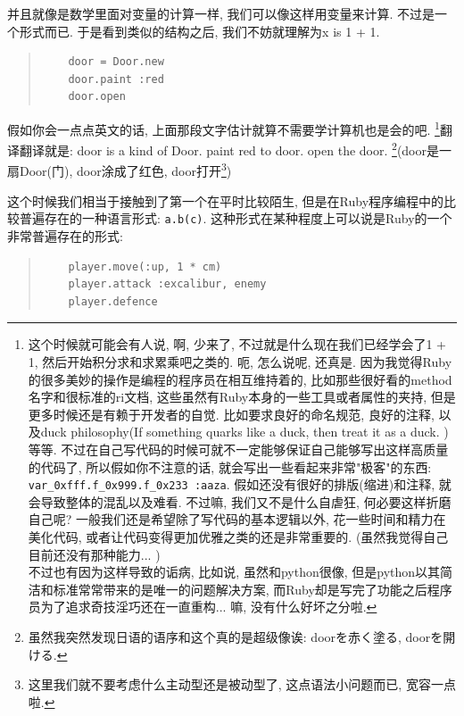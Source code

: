 并且就像是数学里面对变量的计算一样, 我们可以像这样用变量来计算. 不过是一个形式而已. 于是看到类似的结构之后, 我们不妨就理解为x is 1 + 1. 

\begin{quotation}
  \begin{verbatim}
    door = Door.new
    door.paint :red
    door.open
  \end{verbatim}
\end{quotation}

假如你会一点点英文的话, 上面那段文字估计就算不需要学计算机也是会的吧. \footnote{这个时候就可能会有人说, 啊, 少来了, 不过就是什么现在我们已经学会了1 + 1, 然后开始积分求和求累乘吧之类的. 呃, 怎么说呢, 还真是. 因为我觉得Ruby的很多美妙的操作是编程的程序员在相互维持着的, 比如那些很好看的method名字和很标准的ri文档, 这些虽然有Ruby本身的一些工具或者属性的夹持, 但是更多时候还是有赖于开发者的自觉. 比如要求良好的命名规范, 良好的注释, 以及duck philosophy(If something quarks like a duck, then treat it as a duck. )等等. 不过在自己写代码的时候可就不一定能够保证自己能够写出这样高质量的代码了, 所以假如你不注意的话, 就会写出一些看起来非常"极客"的东西: \texttt{var_0xfff.f_0x999.f_0x233 :aaza}. 假如还没有很好的排版(缩进)和注释, 就会导致整体的混乱以及难看. 不过嘛, 我们又不是什么自虐狂, 何必要这样折磨自己呢? 一般我们还是希望除了写代码的基本逻辑以外, 花一些时间和精力在美化代码, 或者让代码变得更加优雅之类的还是非常重要的. (虽然我觉得自己目前还没有那种能力... )\\不过也有因为这样导致的诟病, 比如说, 虽然和python很像, 但是python以其简洁和标准常常带来的是唯一的问题解决方案, 而Ruby却是写完了功能之后程序员为了追求奇技淫巧还在一直重构... 嘛, 没有什么好坏之分啦. }翻译翻译就是: door is a kind of Door. paint red to door. open the door. \footnote{虽然我突然发现日语的语序和这个真的是超级像诶: doorを赤く塗る, doorを開ける. }(door是一扇Door(门), door涂成了红色, door打开\footnote{这里我们就不要考虑什么主动型还是被动型了, 这点语法小问题而已, 宽容一点啦. })

这个时候我们相当于接触到了第一个在平时比较陌生, 但是在Ruby程序编程中的比较普遍存在的一种语言形式: \texttt{a.b(c)}. 这种形式在某种程度上可以说是Ruby的一个非常普遍存在的形式: 

\begin{quotation}
  \begin{verbatim}
    player.move(:up, 1 * cm)
    player.attack :excalibur, enemy
    player.defence
  \end{verbatim}
\end{quotation}

